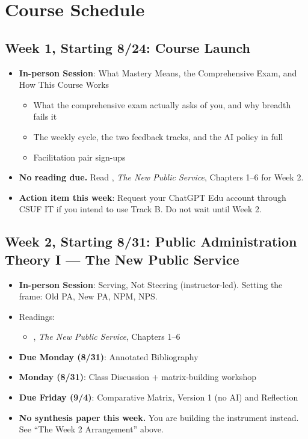 \documentclass[11pt]{article}     %
\begin{document}

\section*{Course Schedule}

\subsection*{Week 1, Starting 8/24: Course Launch}
\begin{itemize}
    \item \textbf{In-person Session}: What Mastery Means, the Comprehensive Exam, and How This Course Works
    \begin{itemize}
        \item What the comprehensive exam actually asks of you, and why breadth fails it
        \item The weekly cycle, the two feedback tracks, and the AI policy in full
        \item Facilitation pair sign-ups
    \end{itemize}
    \item \textbf{No reading due.} Read \citet{Denhardt2015}, \emph{The New Public Service}, Chapters 1--6 for Week 2.
    \item \textbf{Action item this week}: Request your ChatGPT Edu account through CSUF IT if you intend to use Track B. Do not wait until Week 2.
\end{itemize}

\subsection*{Week 2, Starting 8/31: Public Administration Theory I --- The New Public Service}
\begin{itemize}
    \item \textbf{In-person Session}: Serving, Not Steering (instructor-led). Setting the frame: Old PA, New PA, NPM, NPS.
    \item Readings:
        \begin{itemize}
            \item \citet{Denhardt2015}, \emph{The New Public Service}, Chapters 1--6
        \end{itemize}
    \item \textbf{Due Monday (8/31)}: Annotated Bibliography
    \item \textbf{Monday (8/31)}: Class Discussion + matrix-building workshop
    \item \textbf{Due Friday (9/4)}: Comparative Matrix, Version 1 (no AI) and Reflection
    \item \textbf{No synthesis paper this week.} You are building the instrument instead. See ``The Week 2 Arrangement'' above.
\end{itemize}
\end{document}
